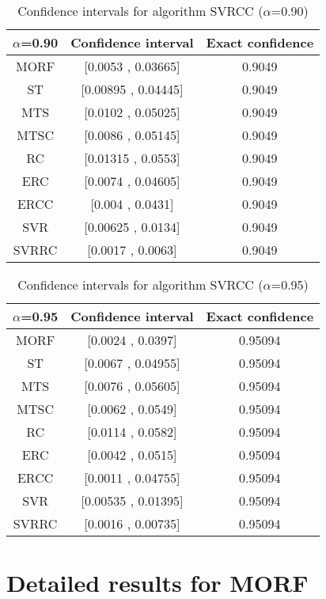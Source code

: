 \documentclass[a4paper,10pt]{article}
\begin{document}
\begin{table}[!htp]
\centering\small
\begin{tabular}{
|c|c|c|}
\hline
 $\alpha$=0.90 & Confidence interval & Exact confidence \\ \hline 
MORF & [0.0053 , 0.03665] & 0.9049\\ \hline 
ST & [0.00895 , 0.04445] & 0.9049\\ \hline 
MTS & [0.0102 , 0.05025] & 0.9049\\ \hline 
MTSC & [0.0086 , 0.05145] & 0.9049\\ \hline 
RC & [0.01315 , 0.0553] & 0.9049\\ \hline 
ERC & [0.0074 , 0.04605] & 0.9049\\ \hline 
ERCC & [0.004 , 0.0431] & 0.9049\\ \hline 
SVR & [0.00625 , 0.0134] & 0.9049\\ \hline 
SVRRC & [0.0017 , 0.0063] & 0.9049\\ \hline 

\end{tabular}
\caption{Confidence intervals for algorithm SVRCC ($\alpha$=0.90)}
\end{table}
\begin{table}[!htp]
\centering\small
\begin{tabular}{
|c|c|c|}
\hline
 $\alpha$=0.95 & Confidence interval & Exact confidence \\ \hline 
MORF & [0.0024 , 0.0397] & 0.95094\\ \hline 
ST & [0.0067 , 0.04955] & 0.95094\\ \hline 
MTS & [0.0076 , 0.05605] & 0.95094\\ \hline 
MTSC & [0.0062 , 0.0549] & 0.95094\\ \hline 
RC & [0.0114 , 0.0582] & 0.95094\\ \hline 
ERC & [0.0042 , 0.0515] & 0.95094\\ \hline 
ERCC & [0.0011 , 0.04755] & 0.95094\\ \hline 
SVR & [0.00535 , 0.01395] & 0.95094\\ \hline 
SVRRC & [0.0016 , 0.00735] & 0.95094\\ \hline 

\end{tabular}
\caption{Confidence intervals for algorithm SVRCC ($\alpha$=0.95)}
\end{table}

 \clearpage 


\section{Detailed results for MORF}
\end{document}
